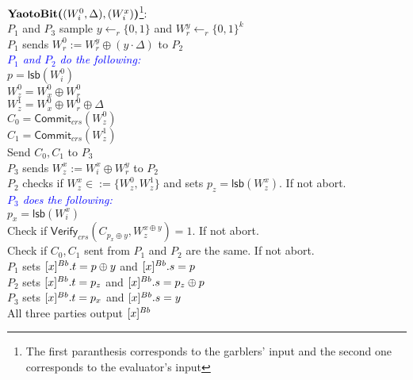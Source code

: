 \begin{protocol}
	\noindent	
	$\textbf{YaotoBit(}(W^0_i, \Delta), (W^x_i)\textbf{)}$\footnote{The first paranthesis corresponds to the garblers' input and the second one corresponds to the evaluator's input}:\\
	\indent $P_1$ and $P_3$ sample $y \gets_r \{0,1\}$ and $W_r^y \gets_r \{0,1\}^k$ \\
	\indent $P_1$ sends $W_r^0 := W_r^y \oplus (y \cdot \Delta)$ to $P_2$\\
	\indent \textcolor{blue}{\textit{$P_1$ and $P_2$ do the following:}} \\
	\indent $p = \mathsf{lsb}(W^0_i)$ \\
	\indent $W^0_z = W^0_x \oplus W_r^0$ \\
	\indent $W^1_z = W^0_x \oplus W_r^0 \oplus \Delta$ \\
	\indent $C_0= \mathsf{Commit}_{crs}(W^0_z)$ \\
	\indent $C_1= \mathsf{Commit}_{crs}(W^1_z)$ \\
	\indent Send $C_0, C_1$ to $P_3$ \\
	\indent $P_3$ sends $W_z^x := W^x_i \oplus W_r^y$ to $P_2$\\
	\indent $P_2$ checks if $W_z^x \in := \{W^0_z, W^1_z\}$ and sets $p_z = \mathsf{lsb}(W_z^x)$. If not abort.\\
	\indent \textcolor{blue}{\textit{$P_3$ does the following:}} \\
	\indent $p_x = \mathsf{lsb}(W_i^x)$ \\
	\indent Check if $\mathsf{Verify}_{crs}(C_{p_x \oplus y}, W^{x \oplus y}_z) = 1$. If not abort. \\
	\indent Check if $C_0, C_1$ sent from $P_1$ and $P_2$ are the same. If not abort. \\
	\indent $P_1$ sets $[x]^{Bb}.t = p \oplus y$ and $[x]^{Bb}.s = p$ \\
	\indent $P_2$ sets $[x]^{Bb}.t = p_z$ and $[x]^{Bb}.s = p_z \oplus p$ \\
	\indent $P_3$ sets $[x]^{Bb}.t = p_x$ and $[x]^{Bb}.s = y$ \\
	\indent All three parties output $[x]^{Bb}$
	
\end{protocol}

